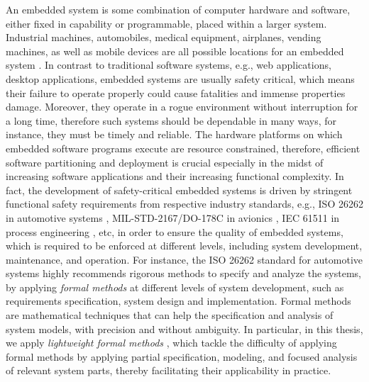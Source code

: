 
An embedded system is some combination of computer hardware and software, either fixed in capability or programmable, placed within a larger system. Industrial machines, automobiles, medical equipment, airplanes, vending machines, as well as mobile devices are all possible locations for an embedded system  \cite{WangJiacun2017RES}. In contrast to traditional software systems, e.g., web applications, desktop applications, embedded systems are usually safety critical, which means their failure to operate properly could cause fatalities and immense properties damage. Moreover, they operate in a rogue environment without interruption for a long time, therefore such systems should be dependable in many ways, for instance, they must be timely and reliable. The hardware platforms on which embedded software programs execute are resource constrained, therefore, efficient software partitioning and deployment is crucial especially in the midst of increasing software applications and their increasing functional complexity. In fact, the development of safety-critical embedded systems is driven by stringent functional safety requirements from respective industry standards, e.g., ISO 26262  in automotive systems \cite{iso201126262}, MIL-STD-2167/DO-178C in avionics \cite{Wang2016DevelopingDO-178Cb}, IEC 61511 in process engineering \cite{bond2002iec}, etc, in order to ensure the quality of embedded systems, which is required to be enforced at different levels, including system development, maintenance, and operation. For instance, the ISO 26262 standard for automotive systems highly recommends rigorous methods to specify and analyze the systems, by applying \textit{formal methods} at different levels of system development, such as requirements specification, system design and implementation. Formal methods \cite{OreganUndergraduateScience} are mathematical techniques that can help the specification and analysis of system models, with precision and without ambiguity. In particular, in this thesis, we apply \textit{lightweight formal methods} \cite{lightweigh2001,Agerholm1999AMethods}, which tackle the difficulty of applying formal methods by applying partial specification, modeling, and focused analysis of relevant system parts, thereby facilitating their applicability in practice. 
